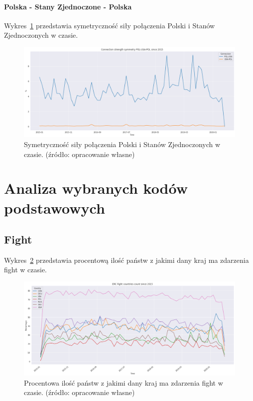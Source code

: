 \documentclass[11pt]{report}
\begin{document}
    \paragraph{Polska - Stany Zjednoczone - Polska}

    Wykres~\ref{fig:POL-USA-POL} przedstawia symetryczność siły połączenia Polski i Stanów Zjednoczonych w czasie.


    \begin{figure}[ht!]
        \centering
        \includegraphics[width=1 \textwidth]{fig/ConnectionSymmetry/POL-USA-POL.png}
        \caption{Symetryczność siły połączenia Polski i Stanów Zjednoczonych w czasie. (źródło: opracowanie własne)}
        \label{fig:POL-USA-POL}
    \end{figure}


    \section{Analiza wybranych kodów podstawowych}

    \subsection{Fight}

    Wykres~\ref{fig:Fight} przedstawia procentową ilość państw z jakimi dany kraj ma zdarzenia fight w czasie.


    \begin{figure}[ht!]
        \centering
        \includegraphics[width=1 \textwidth]{fig/ERC/Fight.png}
        \caption{Procentowa ilość państw z jakimi dany kraj ma zdarzenia fight w czasie. (źródło: opracowanie własne)}
        \label{fig:Fight}
    \end{figure}
\end{document}
